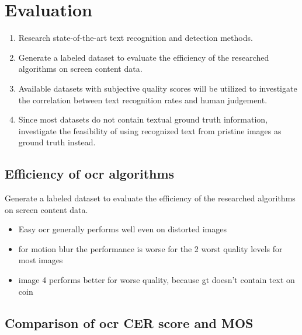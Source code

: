 \chapter{Evaluation}
\label{chap:evaluation}

\begin{enumerate}
\item Research state-of-the-art text recognition and detection methods.

\item Generate a labeled dataset to evaluate the efficiency of the researched algorithms
   on screen content data.

\item Available datasets with subjective quality scores will be utilized to investigate
   the correlation between text recognition rates and human judgement.

\item Since most datasets do not contain textual ground truth information,
   investigate the feasibility of using recognized text from pristine images as ground truth instead.

\end{enumerate}

\section{Efficiency of ocr algorithms}

Generate a labeled dataset to evaluate the efficiency of the researched algorithms
on screen content data.

\begin{itemize}
\item Easy ocr generally performs well even on distorted images
\item for motion blur the performance is worse for the 2 worst quality levels for most images
\item image 4 performs better for worse quality, because gt doesn't contain text on coin
\end{itemize}


\section{Comparison of ocr CER score and MOS}

